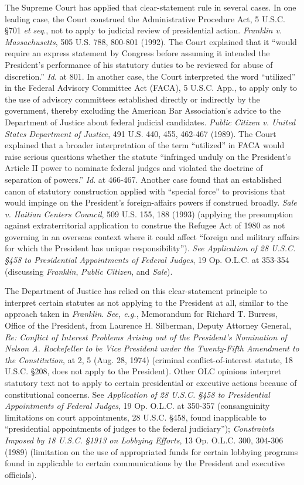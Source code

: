 The Supreme Court has applied that clear-statement rule in several cases.
In one leading case, the Court construed the Administrative Procedure Act, 5 U.S.C. \S 701 \textit{et seq}., not to apply to judicial review of presidential action.
\textit{Franklin v. Massachusetts}, 505 U.S. 788, 800-801 (1992).
The Court explained that it “would require an express statement by Congress before assuming it intended the President’s performance of his statutory duties to be reviewed for abuse of discretion.”
\textit{Id}. at 801.
In another case, the Court interpreted the word “utilized” in the Federal Advisory Committee Act (FACA), 5 U.S.C. App., to apply only to the use of advisory committees established directly or indirectly by the government, thereby excluding the American Bar Association’s advice to the Department of Justice about federal judicial candidates.
\textit{Public Citizen v. United States Department of Justice}, 491 U.S. 440, 455, 462-467 (1989).
The Court explained that a broader interpretation of the term “utilized” in FACA would raise serious questions whether the statute “infringed unduly on the President’s Article II power to nominate federal judges and violated the doctrine of separation of powers.”
\textit{Id}. at 466-467.
Another case found that an established canon of statutory construction applied with “special force” to provisions that would impinge on the President’s foreign-affairs powers if construed broadly.
\textit{Sale v. Haitian Centers Council}, 509 U.S. 155, 188 (1993) (applying the presumption against extraterritorial application to construe the Refugee Act of 1980 as not governing in an overseas context where it could affect “foreign and military affairs for which the President has unique responsibility”).
\textit{See Application of 28 U.S.C. \S 458 to Presidential Appointments of Federal Judges}, 19 Op. O.L.C. at 353-354 (discussing \textit{Franklin}, \textit{Public Citizen}, and \textit{Sale}).

The Department of Justice has relied on this clear-statement principle to interpret certain statutes as not applying to the President at all, similar to the approach taken in \textit{Franklin}.
\textit{See, e.g.}, Memorandum for Richard T. Burress, Office of the President, from Laurence H. Silberman, Deputy Attorney General, \textit{Re: Conflict of Interest Problems Arising out of the President's Nomination of Nelson A. Rockefeller to be Vice President under the Twenty-Fifth Amendment to the Constitution}, at 2, 5 (Aug. 28, 1974) (criminal conflict-of-interest statute, 18 U.S.C. \S 208, does not apply to the President).
Other OLC opinions interpret statutory text not to apply to certain presidential or executive actions because of constitutional concerns.
See \textit{Application of 28 U.S.C. \S 458 to Presidential Appointments of Federal Judges}, 19 Op. O.L.C. at 350-357 (consanguinity limitations on court appointments, 28 U.S.C. \S 458, found inapplicable to “presidential appointments of judges to the federal judiciary”);
\textit{Constraints Imposed by 18 U.S.C. \S 1913 on Lobbying Efforts}, 13 Op. O.L.C. 300, 304-306 (1989) (limitation on the use of appropriated funds for certain lobbying programs found in applicable to certain communications by the President and executive officials).

